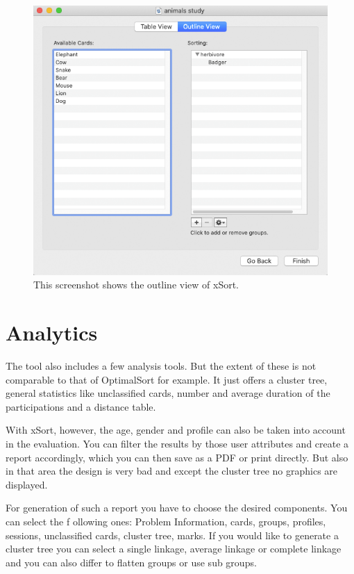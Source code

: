 \begin{figure}[h] 
\centering
\includegraphics[keepaspectratio,width=460px]{images/xsort-outlineview.png}
\caption[xSort Outline View] { This screenshot shows the outline view of xSort.
 }
\label{fig:xSort-outlineview}
\end{figure}

\section{Analytics}
The tool also includes a few analysis tools. But the extent of these is not comparable to that of 
OptimalSort for example. It just offers a cluster tree, general statistics like unclassified cards, 
number and average duration of the participations and a distance table.  

With xSort, however, the age, gender and profile can also be taken into account in the evaluation. 
You can filter the results by those user attributes and create a report accordingly, which you can 
then save as a PDF or print directly. But also in that area the design is very bad and except the 
cluster tree no graphics are displayed.

For generation of such a report you have to choose the desired components. You can select the f
ollowing ones: Problem Information, cards, groups, profiles, sessions, unclassified cards, cluster 
tree, marks. If you would like to generate a cluster tree you can select a single linkage, average 
linkage or complete linkage and you can also differ to flatten groups or use sub groups.

